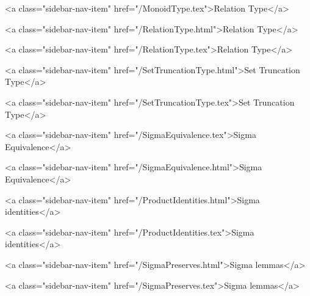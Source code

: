       
        
          <a class="sidebar-nav-item" href="/MonoidType.tex">Relation Type</a>
        
      
    
      
        
          <a class="sidebar-nav-item" href="/RelationType.html">Relation Type</a>
        
      
    
      
        
          <a class="sidebar-nav-item" href="/RelationType.tex">Relation Type</a>
        
      
    
      
        
          <a class="sidebar-nav-item" href="/SetTruncationType.html">Set Truncation Type</a>
        
      
    
      
        
          <a class="sidebar-nav-item" href="/SetTruncationType.tex">Set Truncation Type</a>
        
      
    
      
        
          <a class="sidebar-nav-item" href="/SigmaEquivalence.tex">Sigma Equivalence</a>
        
      
    
      
        
          <a class="sidebar-nav-item" href="/SigmaEquivalence.html">Sigma Equivalence</a>
        
      
    
      
        
          <a class="sidebar-nav-item" href="/ProductIdentities.html">Sigma identities</a>
        
      
    
      
        
          <a class="sidebar-nav-item" href="/ProductIdentities.tex">Sigma identities</a>
        
      
    
      
        
          <a class="sidebar-nav-item" href="/SigmaPreserves.html">Sigma lemmas</a>
        
      
    
      
        
          <a class="sidebar-nav-item" href="/SigmaPreserves.tex">Sigma lemmas</a>
        

